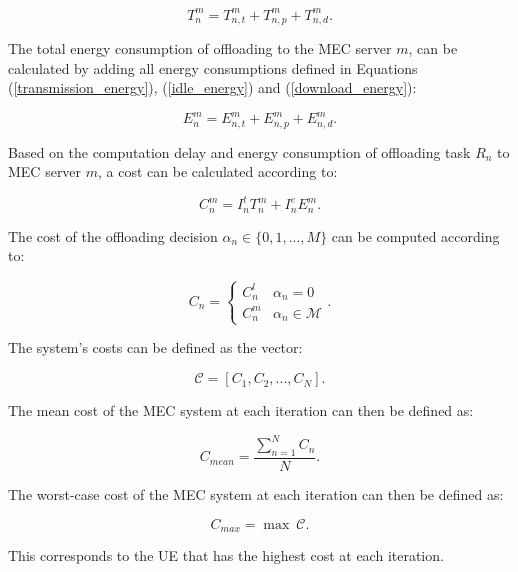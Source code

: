 \begin{equation}
    T_n^m = T_{n,t}^m + T_{n,p}^m + T_{n, d}^m .
\end{equation}

The total energy consumption of offloading to the \acrshort{MEC} server $m$, can be calculated by adding all energy consumptions defined in Equations (\ref{transmission_energy}), (\ref{idle_energy}) and (\ref{download_energy}):

\begin{equation}
    E_n^m = E_{n,t}^m + E_{n,p}^m + E_{n, d}^m .
\end{equation}

Based on the computation delay and energy consumption of offloading task $R_n$ to \acrshort{MEC} server $m$, a cost can be calculated according to:

\begin{equation}
    C_n^m = I_n^t T_n^m + I_n^e E_n^m .
\end{equation}

The cost of the offloading decision $\alpha_n \in \{0, 1, ..., M\}$ can be computed according to:

\begin{equation}
    C_n =
    \begin{cases}
        C_n^l & \alpha_n = 0             \\
        C_n^m & \alpha_n \in \mathcal{M}
    \end{cases} .
\end{equation}

The system's costs can be defined as the vector:

\begin{equation}
    \mathcal{C} = [C_1, C_2, ..., C_N].
\end{equation}


The mean cost of the \acrshort{MEC} system at each iteration can then be defined as:

\begin{equation} \label{C_mean}
    C_{mean} = \frac{\sum\limits_{n=1}^N C_n}{N}.
\end{equation}

The worst-case cost of the \acrshort{MEC} system at each iteration can then be defined as:

\begin{equation}
    C_{max} = \max \ \mathcal{C}.
\end{equation}

This corresponds to the \acrshort{UE} that has the highest cost at each iteration.


